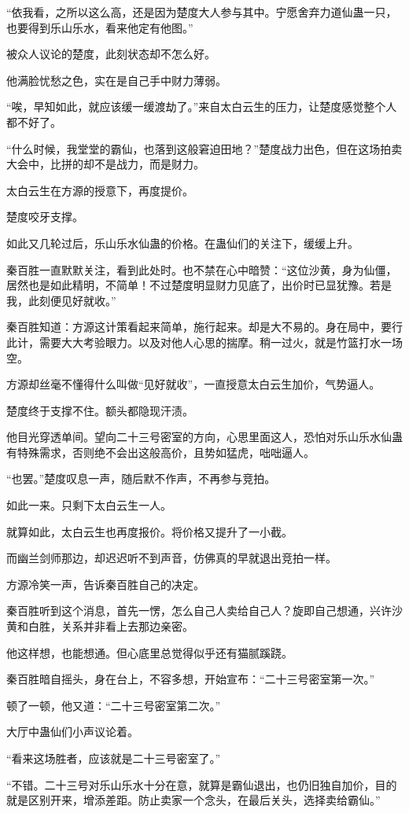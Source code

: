 \begin{this_body}
“依我看，之所以这么高，还是因为楚度大人参与其中。宁愿舍弃力道仙蛊一只，也要得到乐山乐水，看来他定有他图。”

被众人议论的楚度，此刻状态却不怎么好。

他满脸忧愁之色，实在是自己手中财力薄弱。

“唉，早知如此，就应该缓一缓渡劫了。”来自太白云生的压力，让楚度感觉整个人都不好了。

“什么时候，我堂堂的霸仙，也落到这般窘迫田地？”楚度战力出色，但在这场拍卖大会中，比拼的却不是战力，而是财力。

太白云生在方源的授意下，再度提价。

楚度咬牙支撑。

如此又几轮过后，乐山乐水仙蛊的价格。在蛊仙们的关注下，缓缓上升。

秦百胜一直默默关注，看到此处时。也不禁在心中暗赞：“这位沙黄，身为仙僵，居然也是如此精明，不简单！不过楚度明显财力见底了，出价时已显犹豫。若是我，此刻便见好就收。”

秦百胜知道：方源这计策看起来简单，施行起来。却是大不易的。身在局中，要行此计，需要大大考验眼力。以及对他人心思的揣摩。稍一过火，就是竹篮打水一场空。

方源却丝毫不懂得什么叫做“见好就收”，一直授意太白云生加价，气势逼人。

楚度终于支撑不住。额头都隐现汗渍。

他目光穿透单间。望向二十三号密室的方向，心思里面这人，恐怕对乐山乐水仙蛊有特殊需求，否则绝不会出这般高价，且势如猛虎，咄咄逼人。

“也罢。”楚度叹息一声，随后默不作声，不再参与竞拍。

如此一来。只剩下太白云生一人。

就算如此，太白云生也再度报价。将价格又提升了一小截。

而幽兰剑师那边，却迟迟听不到声音，仿佛真的早就退出竞拍一样。

方源冷笑一声，告诉秦百胜自己的决定。

秦百胜听到这个消息，首先一愣，怎么自己人卖给自己人？旋即自己想通，兴许沙黄和白胜，关系并非看上去那边亲密。

他这样想，也能想通。但心底里总觉得似乎还有猫腻蹊跷。

秦百胜暗自摇头，身在台上，不容多想，开始宣布：“二十三号密室第一次。”

顿了一顿，他又道：“二十三号密室第二次。”

大厅中蛊仙们小声议论着。

“看来这场胜者，应该就是二十三号密室了。”

“不错。二十三号对乐山乐水十分在意，就算是霸仙退出，也仍旧独自加价，目的就是区别开来，增添差距。防止卖家一个念头，在最后关头，选择卖给霸仙。”


\end{this_body}
